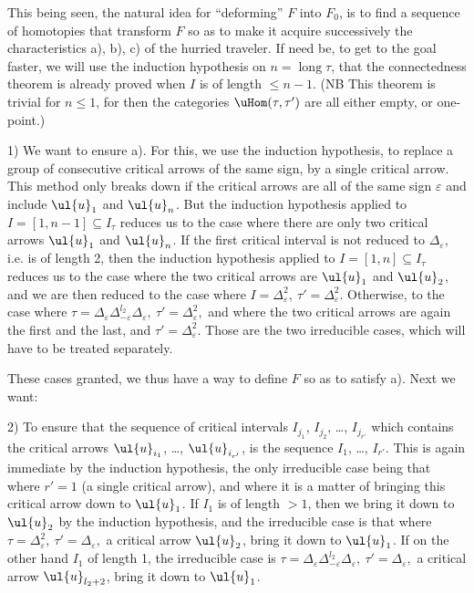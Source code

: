 This being seen, the natural idea for ``deforming'' $F$ into $F_0$, is to find a sequence of homotopies that transform $F$ so as to make it acquire successively the characteristics a), b), c) of the hurried traveler. If need be, to get to the goal faster, we will use the induction hypothesis on $n=\operatorname{long}\tau$, that the connectedness theorem is already proved when $I$ is of length $\leq n-1$. (NB This theorem is trivial for $n\leq1$, for then the categories $\uHom(\tau,\tau')$ are all either empty, or one-point.)

1) We want to ensure a). For this, we use the induction hypothesis, to replace a group of consecutive critical arrows of the same sign, by a single critical arrow. This method only breaks down if the critical arrows are all of the same sign $\varepsilon$ and include $\ul{u}_1$ and $\ul{u}_n$. But the induction hypothesis applied to $I=[1,n-1]\subseteq I_\tau$ reduces us to the case where there are only two critical arrows $\ul{u}_1$ and $\ul{u}_n$. If the first critical interval is not reduced to $\Delta_\varepsilon$, i.e. is of length 2, then the induction hypothesis applied to $I=[1,n]\subseteq I_\tau$ reduces us to the case where the two critical arrows are $\ul{u}_1$ and $\ul{u}_2$, and we are
then reduced to the case where $\boxed{I=\Delta^2_\varepsilon,\ \tau'=\Delta^2_\varepsilon.}$ Otherwise, to the case where $\boxed{\tau=\Delta_\varepsilon\Delta^{l_2}_{-\varepsilon}\Delta_\varepsilon,\ \tau'=\Delta^2_\varepsilon,}$ and where the two critical arrows are again the first and the last, and $\tau'=\Delta^2_\varepsilon$. Those are the two irreducible cases, which will have to be treated separately.

These cases granted, we thus have a way to define $F$ so as to satisfy a). Next we want:

2) To ensure that the sequence of critical intervals $I_{j_1}$, $I_{j_2}$, \dots, $I_{j_{r'}}$ which contains the critical arrows $\ul{u}_{i_1}$, \dots, $\ul{u}_{i_{r'}}$, is the sequence $I_1$, \dots, $I_{r'}$. This is again immediate by the induction hypothesis, the only irreducible case being that where $r'=1$ (a single critical arrow), and where it is a matter of bringing this critical arrow down to $\ul{u}_1$. If $I_1$ is of length $>1$, then we bring it down to $\ul{u}_2$ by the induction hypothesis, and the irreducible case is that where $\boxed{\tau=\Delta^2_\varepsilon,\ \tau'=\Delta_\varepsilon,}$ a critical arrow $\ul{u}_2$, bring it down to $\ul{u}_1$. If on the other hand $I_1$ of length 1, the irreducible case is $\boxed{\tau=\Delta_\varepsilon\Delta^{l_2}_{-\varepsilon}\Delta_\varepsilon,\ \tau'=\Delta_\varepsilon,}$ a critical arrow $\ul{u}_{l_2+2}$, bring it down to $\ul{u}_1$.

